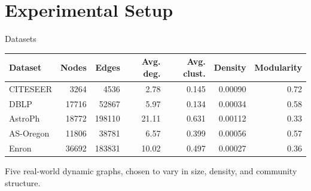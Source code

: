 \documentclass[aspectratio=169]{beamer}
\begin{document}
\section{Experimental Setup}

\begin{frame}{Datasets}
  \footnotesize
  \begin{tabular}{lrrrrrr}
    \toprule
    Dataset & Nodes & Edges & Avg. deg. & Avg. clust. & Density & Modularity \\
    \midrule
    CITESEER   & 3264  & 4536   & 2.78  & 0.145 & 0.00090 & 0.72 \\
    DBLP       & 17716 & 52867  & 5.97  & 0.134 & 0.00034 & 0.58 \\
    AstroPh    & 18772 & 198110 & 21.11 & 0.631 & 0.00112 & 0.33 \\
    AS-Oregon  & 11806 & 38781  & 6.57  & 0.399 & 0.00056 & 0.57 \\
    Enron      & 36692 & 183831 & 10.02 & 0.497 & 0.00027 & 0.36 \\
    \bottomrule
  \end{tabular}
  \vspace{1em}

  Five real-world dynamic graphs, chosen to vary in size, density, and community structure.
\end{frame}
\end{document}
